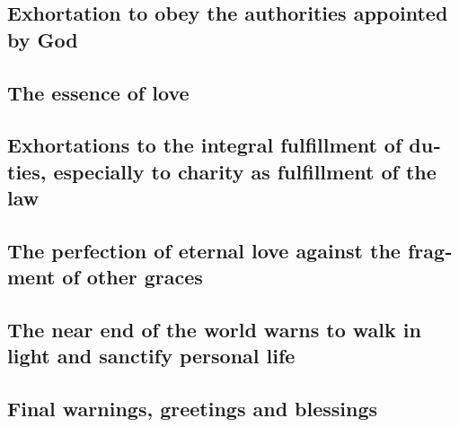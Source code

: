 \begin{paracol}{2}
\begin{otherlanguage}{english}
\hypertarget{exhortation-to-obey-the-authorities-appointed-by-god}{%
\subsection{Exhortation to obey the authorities appointed by
God}\label{exhortation-to-obey-the-authorities-appointed-by-god}}

\hypertarget{the-essence-of-love}{%
\subsection{The essence of love}\label{the-essence-of-love}}

\hypertarget{exhortations-to-the-integral-fulfillment-of-duties-especially-to-charity-as-fulfillment-of-the-law}{%
\subsection{Exhortations to the integral fulfillment of duties,
especially to charity as fulfillment of the
law}\label{exhortations-to-the-integral-fulfillment-of-duties-especially-to-charity-as-fulfillment-of-the-law}}

\hypertarget{the-perfection-of-eternal-love-against-the-fragment-of-other-graces}{%
\subsection{The perfection of eternal love against the fragment of other
graces}\label{the-perfection-of-eternal-love-against-the-fragment-of-other-graces}}

\hypertarget{the-near-end-of-the-world-warns-to-walk-in-light-and-sanctify-personal-life}{%
\subsection{The near end of the world warns to walk in light and
sanctify personal
life}\label{the-near-end-of-the-world-warns-to-walk-in-light-and-sanctify-personal-life}}

\hypertarget{final-warnings-greetings-and-blessings}{%
\subsection{Final warnings, greetings and
blessings}\label{final-warnings-greetings-and-blessings}}

\hypertarget{judgment-on-the-topic-that-moves-the-community-and-warns-against-the-unloving-condemnation-of-the-external-way-of-life-of-the-neighbor}{%
}
\end{otherlanguage}
\end{paracol}
